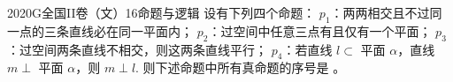 
\begin{problem}{2020}{G}{全国II卷（文）}{16}{命题与逻辑}
设有下列四个命题：
$ p_1 $：两两相交且不过同一点的三条直线必在同一平面内；
$ p_2 $：过空间中任意三点有且仅有一个平面；
$ p_3 $：过空间两条直线不相交，则这两条直线平行；
$ p_4 $：若直线 $ l\subset $ 平面 $ \alpha $，直线 $ m\perp $ 平面 $ \alpha $，则 $ m\perp l $.
则下述命题中所有真命题的序号是 \underline{\hspace{4em}}。
\begin{choices}
\end{choices}
\end{problem}

\begin{answer}

\end{answer}

\begin{solutions}

\end{solutions}